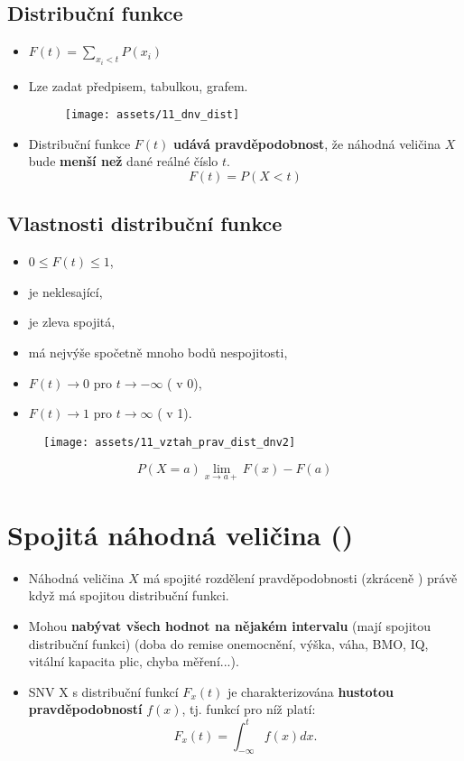 \subsection{Distribuční funkce}
\begin{itemize}
    \item $F(t) = \sum_{x_i < t} P(x_i)$
    \item Lze zadat předpisem, tabulkou, grafem.
          \begin{figure}[H]
              \centering
              \texttt{[image: assets/11\_dnv\_dist]}
          \end{figure}
    \item Distribuční funkce $F(t)$ \textbf{udává pravděpodobnost}, že náhodná veličina $X$ bude \textbf{menší než} dané reálné číslo $t$. $$F(t) = P(X < t)$$
\end{itemize}
\subsection*{Vlastnosti distribuční funkce}
\begin{itemize}
    \item $0 \leq F(t) \leq 1$,
    \item je neklesající,
    \item je zleva spojitá,
    \item má nejvýše spočetně mnoho bodů nespojitosti,
    \item $F(t) \rightarrow 0 $ pro $ t \rightarrow -\infty $ ( v 0),
    \item $F(t) \rightarrow 1 $ pro $ t \rightarrow \infty $ ( v 1).
\end{itemize}
\begin{figure}[H]
    \centering
    \texttt{[image: assets/11\_vztah\_prav\_dist\_dnv2]}
\end{figure}
$$P(X = a) \lim_{x \to a+} F(x) - F(a)$$

\section{Spojitá náhodná veličina ()}

\begin{itemize}
    \item Náhodná veličina $X$ má spojité rozdělení pravděpodobnosti (zkráceně ) právě když má spojitou distribuční funkci.
    \item Mohou \textbf{nabývat všech hodnot na nějakém intervalu} (mají spojitou distribuční funkci) (doba do remise onemocnění, výška, váha, BMO, IQ, vitální kapacita plic, chyba měření...).
    \item SNV X s distribuční funkcí $F_x(t)$ je charakterizována \textbf{hustotou pravděpodobností} $f(x)$, tj. funkcí pro níž platí:
          \begin{equation*}
              F_x(t) = \int_{-\infty}^{t} f(x) dx.
          \end{equation*}
\end{itemize}
